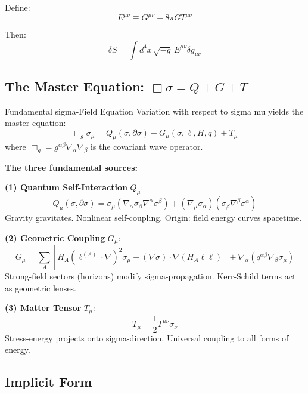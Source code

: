 \documentclass[11pt,a4paper]{article}
\theoremstyle{definition}
\theoremstyle{remark}
\begin{document}
		Define:
		\begin{equation}
			E^{\mu\nu} \equiv G^{\mu\nu} - 8\pi G T^{\mu\nu}
		\end{equation}
		
		Then:
		\begin{equation}
			\delta S = \int d^4x\, \sqrt{-g}\, E^{\mu\nu}\delta g_{\mu\nu}
		\end{equation}
		
		\subsection{The Master Equation: $\Box\sigma = Q + G + T$}
		
		Fundamental sigma-Field Equation
			Variation with respect to sigma mu yields the master equation:
			\begin{equation}\label{eq:master_equation}
				\boxed{\Box_g\sigma_\mu = Q_\mu(\sigma, \partial\sigma) + G_\mu(\sigma, \ell, H, q) + T_\mu}
			\end{equation}
			where $\Box_g = g^{\alpha\beta}\nabla_\alpha\nabla_\beta$ is the covariant wave operator.
		
		\textbf{The three fundamental sources:}
		
		\textbf{(1) Quantum Self-Interaction} $Q_\mu$:
		\begin{equation}\label{eq:Q_source}
			Q_\mu(\sigma, \partial\sigma) = \sigma_\mu(\nabla_\alpha\sigma_\beta\nabla^\alpha\sigma^\beta) + (\nabla_\mu\sigma_\alpha)(\sigma_\beta\nabla^\beta\sigma^\alpha)
		\end{equation}
		Gravity gravitates. Nonlinear self-coupling. Origin: field energy curves spacetime.
		
		\textbf{(2) Geometric Coupling} $G_\mu$:
		\begin{equation}\label{eq:G_source}
			G_\mu = \sum_A\left[H_A(\ell^{(A)}\cdot\nabla)^2\sigma_\mu + (\nabla\sigma)\cdot\nabla(H_A\ell\ell)\right] + \nabla_\alpha(q^{\alpha\beta}\nabla_\beta\sigma_\mu)
		\end{equation}
		Strong-field sectors (horizons) modify sigma-propagation. Kerr-Schild terms act as geometric lenses.
		
		\textbf{(3) Matter Tensor} $T_\mu$:
		\begin{equation}\label{eq:T_source}
			T_\mu = \frac{1}{2}T^{\mu\nu}\sigma_\nu
		\end{equation}
		Stress-energy projects onto sigma-direction. Universal coupling to all forms of energy.		
		\subsection{Implicit Form}
		
\end{document}
